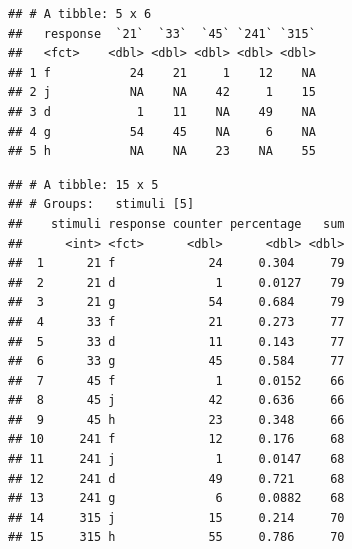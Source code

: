 \documentclass[]{book}
\newenvironment{Shaded}{\begin{snugshade}}{\end{snugshade}}
\newcommand{\KeywordTok}[1]{\textcolor[rgb]{0.13,0.29,0.53}{\textbf{#1}}}
\newcommand{\DataTypeTok}[1]{\textcolor[rgb]{0.13,0.29,0.53}{#1}}
\newcommand{\DecValTok}[1]{\textcolor[rgb]{0.00,0.00,0.81}{#1}}
\newcommand{\StringTok}[1]{\textcolor[rgb]{0.31,0.60,0.02}{#1}}
\newcommand{\OperatorTok}[1]{\textcolor[rgb]{0.81,0.36,0.00}{\textbf{#1}}}
\newcommand{\NormalTok}[1]{#1}
\begin{document}
\begin{verbatim}
## # A tibble: 5 x 6
##   response  `21`  `33`  `45` `241` `315`
##   <fct>    <dbl> <dbl> <dbl> <dbl> <dbl>
## 1 f           24    21     1    12    NA
## 2 j           NA    NA    42     1    15
## 3 d            1    11    NA    49    NA
## 4 g           54    45    NA     6    NA
## 5 h           NA    NA    23    NA    55
\end{verbatim}

\begin{Shaded}
\end{Shaded}

\begin{verbatim}
## # A tibble: 15 x 5
## # Groups:   stimuli [5]
##    stimuli response counter percentage   sum
##      <int> <fct>      <dbl>      <dbl> <dbl>
##  1      21 f             24     0.304     79
##  2      21 d              1     0.0127    79
##  3      21 g             54     0.684     79
##  4      33 f             21     0.273     77
##  5      33 d             11     0.143     77
##  6      33 g             45     0.584     77
##  7      45 f              1     0.0152    66
##  8      45 j             42     0.636     66
##  9      45 h             23     0.348     66
## 10     241 f             12     0.176     68
## 11     241 j              1     0.0147    68
## 12     241 d             49     0.721     68
## 13     241 g              6     0.0882    68
## 14     315 j             15     0.214     70
## 15     315 h             55     0.786     70
\end{verbatim}
\end{document}
